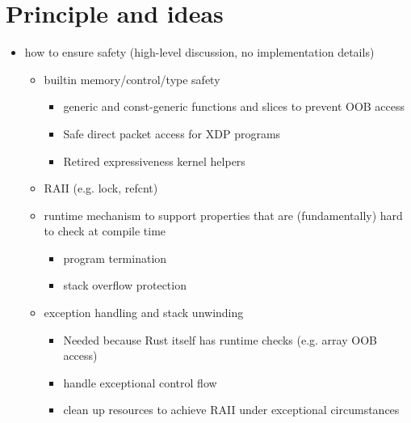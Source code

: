 \section{Principle and ideas}

\begin{itemize}
    \item how to ensure safety (high-level discussion, no implementation
        details)
        \begin{itemize}
            \item builtin memory/control/type safety
                \begin{itemize}
                    \item generic and const-generic functions and slices to
                        prevent OOB access
                    \item Safe direct packet access for XDP programs
                    \item Retired expressiveness kernel helpers
                \end{itemize}
            \item RAII (e.g. lock, refcnt)
            \item runtime mechanism to support properties that are
                (fundamentally) hard to check at compile time
                \begin{itemize}
                    \item program termination
                    \item stack overflow protection
                \end{itemize}
            \item exception handling and stack unwinding
                \begin{itemize}
                    \item Needed because Rust itself has runtime checks (e.g.
                        array OOB access)
                    \item handle exceptional control flow
                    \item clean up resources to achieve RAII under exceptional
                        circumstances
                \end{itemize}
        \end{itemize}
\end{itemize}